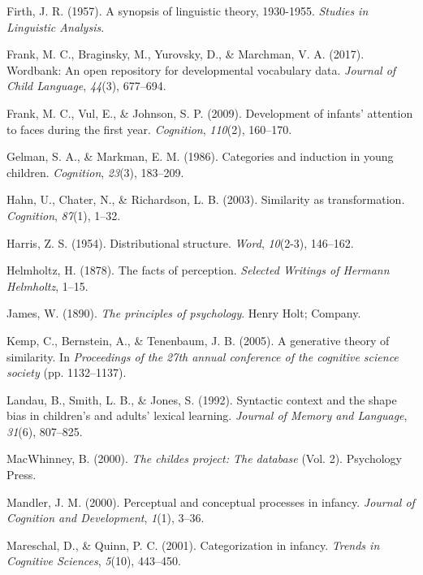 \documentclass[10pt, letterpaper]{article}
\begin{document}
\hypertarget{ref-firth1957synopsis}{}
Firth, J. R. (1957). A synopsis of linguistic theory, 1930-1955.
\emph{Studies in Linguistic Analysis}.

\hypertarget{ref-frank2017wordbank}{}
Frank, M. C., Braginsky, M., Yurovsky, D., \& Marchman, V. A. (2017).
Wordbank: An open repository for developmental vocabulary data.
\emph{Journal of Child Language}, \emph{44}(3), 677--694.

\hypertarget{ref-frank2009development}{}
Frank, M. C., Vul, E., \& Johnson, S. P. (2009). Development of infants'
attention to faces during the first year. \emph{Cognition},
\emph{110}(2), 160--170.

\hypertarget{ref-gelman1986categories}{}
Gelman, S. A., \& Markman, E. M. (1986). Categories and induction in
young children. \emph{Cognition}, \emph{23}(3), 183--209.

\hypertarget{ref-hahn2003similarity}{}
Hahn, U., Chater, N., \& Richardson, L. B. (2003). Similarity as
transformation. \emph{Cognition}, \emph{87}(1), 1--32.

\hypertarget{ref-harris1954distributional}{}
Harris, Z. S. (1954). Distributional structure. \emph{Word},
\emph{10}(2-3), 146--162.

\hypertarget{ref-helmholtz1878facts}{}
Helmholtz, H. (1878). The facts of perception. \emph{Selected Writings
of Hermann Helmholtz}, 1--15.

\hypertarget{ref-james2013principles}{}
James, W. (1890). \emph{The principles of psychology}. Henry Holt;
Company.

\hypertarget{ref-kemp2005generative}{}
Kemp, C., Bernstein, A., \& Tenenbaum, J. B. (2005). A generative theory
of similarity. In \emph{Proceedings of the 27th annual conference of the
cognitive science society} (pp. 1132--1137).

\hypertarget{ref-landau1992syntactic}{}
Landau, B., Smith, L. B., \& Jones, S. (1992). Syntactic context and the
shape bias in children's and adults' lexical learning. \emph{Journal of
Memory and Language}, \emph{31}(6), 807--825.

\hypertarget{ref-macwhinney2000childes}{}
MacWhinney, B. (2000). \emph{The childes project: The database} (Vol.
2). Psychology Press.

\hypertarget{ref-mandler2000perceptual}{}
Mandler, J. M. (2000). Perceptual and conceptual processes in infancy.
\emph{Journal of Cognition and Development}, \emph{1}(1), 3--36.

\hypertarget{ref-mareschal2001categorization}{}
Mareschal, D., \& Quinn, P. C. (2001). Categorization in infancy.
\emph{Trends in Cognitive Sciences}, \emph{5}(10), 443--450.
\end{document}
